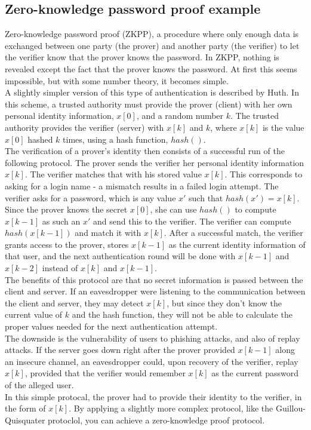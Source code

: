 \documentclass[11pt]{article}
\begin{document}
\subsection{Zero-knowledge password proof example} 
Zero-knowledge password proof (ZKPP)\cite{huth}, a procedure where only enough data is exchanged between one party (the prover) and another party (the verifier) to let the verifier know that the prover knows the password.  In ZKPP, nothing is revealed except the fact that the prover knows the password.  At first this seems impossible, but with some number theory, it becomes simple\cite{gqprotocol}.\\
A slightly simpler version of this type of authentication is described by Huth\cite{huth}. In this scheme, a trusted authority must provide the prover (client) with her own personal identity information, $x[0]$, and a random number $k$.  The trusted authority provides the verifier (server) with $x[k]$ and $k$, where $x[k]$ is the value $x[0]$ hashed $k$ times, using a hash function, $hash()$.\\
	The verification of a prover's identity then consists of a successful run of the following protocol.  The prover sends the verifier her personal identity information $x[k]$.  The verifier matches that with his stored value $x[k]$.  This corresponds to asking for a login name - a mismatch results in a failed login attempt.  The verifier asks for a password, which is any value $x\prime$ such that $hash(x\prime)=x[k]$. Since the prover knows the secret $x[0]$, she can use $hash()$ to compute $x[k-1]$ as such an $x\prime$ and send this to the verifier.  The verifier can compute $hash(x[k-1])$ and match it with $x[k]$.  After a successful match, the verifier grants access to the prover, stores $x[k-1]$ as the current identity information of that user, and the next authentication round will be done with $x[k-1]$ and $x[k-2]$ instead of $x[k]$ and $x[k-1]$.\\
	The benefits of this protocol are that no secret information is passed between the client and server.  If an eavesdropper were listening to the communication between the client and server, they may detect $x[k]$, but since they don't know the current value of $k$ and the hash function, they will not be able to calculate the proper values needed for the next authentication attempt.\\
	The downside is the vulnerability of users to phishing attacks, and also of replay attacks.  If the server goes down right after the prover provided $x[k-1]$ along an insecure channel, an eavesdropper could, upon recovery of the verifier, replay $x[k]$, provided that the verifier would remember $x[k]$ as the current password of the alleged user.\\
In this simple protocal, the prover had to provide their identity to the verifier, in the form of $x[k]$. By applying a slightly more complex protocol, like the Guillou-Quisquater protoclol\cite{gqprotocol}, you can achieve a zero-knowledge proof protocol.
\end{document}
